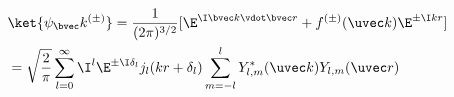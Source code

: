 \begin{equation}
\begin{aligned}
&\ket{\psi_\bvec k^{(\pm)}} = \frac{1}{(2\pi)^{3/2}}[\E^{\I \bvec k \vdot \bvec r} + f^{(\pm)}(\uvec k)\E^{\pm\I kr}]\\
&= \sqrt{\frac{2}{\pi}} \sum_{l=0}^{\infty} \I^l \E^{\pm\I \delta_l} j_l(kr + \delta_l) \sum_{m=-l}^l Y_{l,m}^*(\uvec k) Y_{l,m}(\uvec r)
\end{aligned}
\end{equation}
